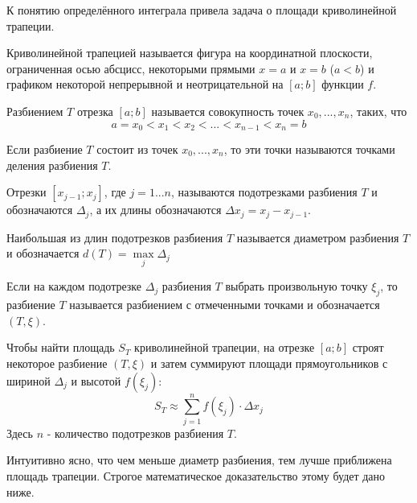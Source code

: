 К понятию определённого интеграла привела задача о площади криволинейной трапеции.

\opred
Криволинейной трапецией называется фигура на координатной плоскости, ограниченная осью абсцисс, некоторыми прямыми $x=a$ и $x=b$ ($a<b$) и графиком некоторой непрерывной и неотрицательной на $[a;b]$ функции $f$.

\opred 
Разбиением $T$ отрезка $[a;b]$ называется совокупность точек ${x_0,...,x_n}$, таких, что 
$$a=x_0<x_1<x_2<...<x_{n-1}<x_n=b$$

\opred
Если разбиение $T$ состоит из точек ${x_0,...,x_n}$, то эти точки называются точками деления разбиения $T$.

\opred
Отрезки $[x_{j-1};x_j]$, где $j=1...n$, называются подотрезками разбиения $T$ и обозначаются $\Delta_j$, а их длины обозначаются $\Delta x_j=x_j-x_{j-1}$.

\opred
Наибольшая из длин подотрезков разбиения $T$ называется диаметром разбиения $T$ и обозначается $d(T)=\max\limits_j \Delta_j$

\opred
Если на каждом подотрезке $\Delta_j$ разбиения $T$ выбрать произвольную точку $\xi_j$, то разбиение $T$ называется разбиением с отмеченными точками и обозначается $(T,\xi)$.

Чтобы найти площадь $S_T$ криволинейной трапеции, на отрезке $[a;b]$ строят некоторое разбиение $(T,\xi)$ и затем суммируют площади прямоугольников с шириной $\Delta_j$ и высотой $f(\xi_j)$:
$$S_T \approx \sum_{j=1}^{n}f(\xi_j)\cdot \Delta x_j$$
Здесь $n$ - количество подотрезков разбиения $T$.

Интуитивно ясно, что чем меньше диаметр разбиения, тем лучше приближена площадь трапеции. Строгое математическое доказательство этому будет дано ниже.

